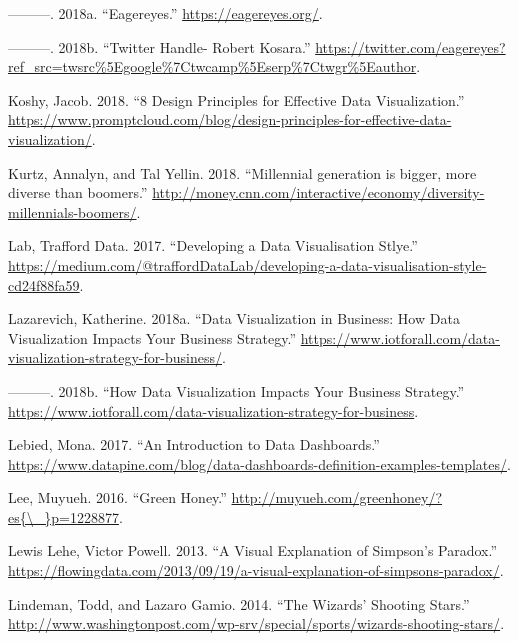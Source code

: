 \documentclass[]{book}
\begin{document}
\leavevmode\hypertarget{ref-eagereyes_viz}{}%
---------. 2018a. ``Eagereyes.'' \url{https://eagereyes.org/}.

\leavevmode\hypertarget{ref-twitter_Kosara}{}%
---------. 2018b. ``Twitter Handle- Robert Kosara.'' \url{https://twitter.com/eagereyes?ref_src=twsrc\%5Egoogle\%7Ctwcamp\%5Eserp\%7Ctwgr\%5Eauthor}.

\leavevmode\hypertarget{ref-promptcloud_2018}{}%
Koshy, Jacob. 2018. ``8 Design Principles for Effective Data Visualization.'' \url{https://www.promptcloud.com/blog/design-principles-for-effective-data-visualization/}.

\leavevmode\hypertarget{ref-age_groups}{}%
Kurtz, Annalyn, and Tal Yellin. 2018. ``Millennial generation is bigger, more diverse than boomers.'' \url{http://money.cnn.com/interactive/economy/diversity-millennials-boomers/}.

\leavevmode\hypertarget{ref-Trafford}{}%
Lab, Trafford Data. 2017. ``Developing a Data Visualisation Stlye.'' \url{https://medium.com/@traffordDataLab/developing-a-data-visualisation-style-cd24f88fa59}.

\leavevmode\hypertarget{ref-strategy_impact}{}%
Lazarevich, Katherine. 2018a. ``Data Visualization in Business: How Data Visualization Impacts Your Business Strategy.'' \url{https://www.iotforall.com/data-visualization-strategy-for-business/}.

\leavevmode\hypertarget{ref-biz_strategy}{}%
---------. 2018b. ``How Data Visualization Impacts Your Business Strategy.'' \url{https://www.iotforall.com/data-visualization-strategy-for-business}.

\leavevmode\hypertarget{ref-Dashboards}{}%
Lebied, Mona. 2017. ``An Introduction to Data Dashboards.'' \url{https://www.datapine.com/blog/data-dashboards-definition-examples-templates/}.

\leavevmode\hypertarget{ref-green_honey}{}%
Lee, Muyueh. 2016. ``Green Honey.'' \href{http://muyueh.com/greenhoney/?es\%7B/_\%7Dp=1228877}{http://muyueh.com/greenhoney/?es\{\textbackslash{}\_\}p=1228877}.

\leavevmode\hypertarget{ref-simpson_paradox}{}%
Lewis Lehe, Victor Powell. 2013. ``A Visual Explanation of Simpson's Paradox.'' \url{https://flowingdata.com/2013/09/19/a-visual-explanation-of-simpsons-paradox/}.

\leavevmode\hypertarget{ref-basketball}{}%
Lindeman, Todd, and Lazaro Gamio. 2014. ``The Wizards' Shooting Stars.'' \url{http://www.washingtonpost.com/wp-srv/special/sports/wizards-shooting-stars/}.
\end{document}
